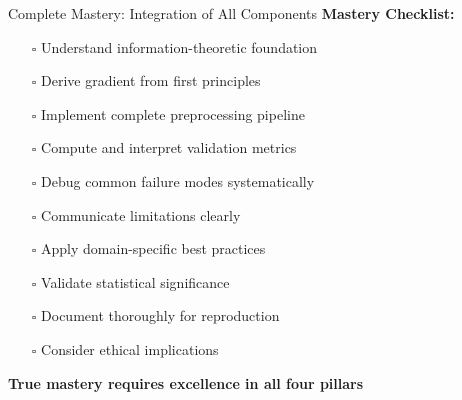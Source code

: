 \documentclass[aspectratio=169]{beamer}
\begin{document}
\begin{frame}{Complete Mastery: Integration of All Components}
\vspace{0.3cm}
\textbf{Mastery Checklist:}
\begin{itemize}
\item[$\square$] Understand information-theoretic foundation
\item[$\square$] Derive gradient from first principles
\item[$\square$] Implement complete preprocessing pipeline
\item[$\square$] Compute and interpret validation metrics
\item[$\square$] Debug common failure modes systematically
\item[$\square$] Communicate limitations clearly
\item[$\square$] Apply domain-specific best practices
\item[$\square$] Validate statistical significance
\item[$\square$] Document thoroughly for reproduction
\item[$\square$] Consider ethical implications
\end{itemize}

\vspace{0.2cm}
\colorbox{yellow!20}{\parbox{0.95\textwidth}{\centering\textbf{True mastery requires excellence in all four pillars}}}
\end{frame}
\end{document}
